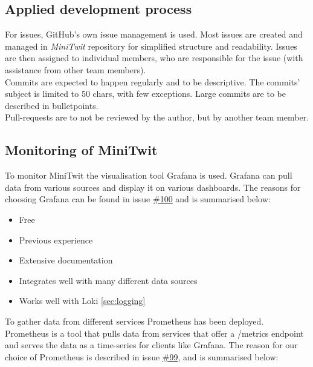\subsection{Applied development process}

For issues, GitHub's own issue management is used. Most issues are created and managed in \textit{MiniTwit} repository for simplified structure and readability. Issues are then assigned to individual members, who are responsible for the issue (with assistance from other team members). \\
Commits are expected to happen regularly and to be descriptive. The commits' subject is limited to 50 chars, with few exceptions. Large commits are to be described in bulletpoints. \\
Pull-requests are to not be reviewed by the author, but by another team member. \cite{contributing.md} \\






\subsection{Monitoring of MiniTwit}

To monitor MiniTwit the visualisation tool Grafana is used. Grafana can pull data from various sources and display it on various dashboards. The reasons for choosing Grafana can be found in issue \href{https://github.com/DevelOpsITU/MiniTwit/issues/100}{\#100} and is summarised below:

\begin{itemize}
    \item Free
    \item Previous experience
    \item Extensive documentation
    \item Integrates well with many different data sources
    \item Works well with Loki \autoref{sec:logging}
\end{itemize} 

To gather data from different services Prometheus has been deployed. Prometheus is a tool that pulls data from services that offer a /metrics endpoint and serves the data as a time-series for clients like Grafana. The reason for our choice of Prometheus is described in issue \href{https://github.com/DevelOpsITU/MiniTwit/issues/99}{\#99}, and is summarised below:

